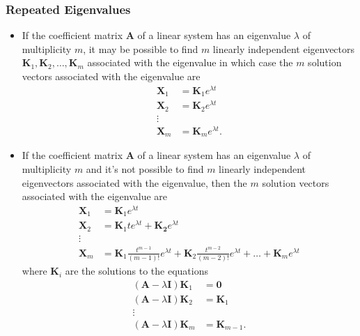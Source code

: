 \documentclass{article}
\begin{document}
\subsubsection{Repeated Eigenvalues}

\begin{itemize}
  \item If the coefficient matrix $\mathbf{A}$ of a linear system has an eigenvalue $\lambda$ of multiplicity $m$, it may be possible to find $m$ linearly independent eigenvectors $\mathbf{K}_1, \mathbf{K}_2, \ldots, \mathbf{K}_m$ associated with the eigenvalue in which case the $m$ solution vectors associated with the eigenvalue are \begin{align*}
          \mathbf{X}_1 & = \mathbf{K}_1 e^{\lambda t}  \\
          \mathbf{X}_2 & = \mathbf{K}_2 e^{\lambda t}  \\
          \vdots                                       \\
          \mathbf{X}_m & = \mathbf{K}_m e^{\lambda t}.
        \end{align*}

  \item If the coefficient matrix $\mathbf{A}$ of a linear system has an eigenvalue $\lambda$ of multiplicity $m$ and it's not possible to find $m$ linearly independent eigenvectors associated with the eigenvalue, then the $m$ solution vectors associated with the eigenvalue are \begin{align*}
          \mathbf{X}_1 & = \mathbf{K}_1 e^{\lambda t}                                                                                                                          \\
          \mathbf{X}_2 & = \mathbf{K}_1 t e^{\lambda t} + \mathbf{K_2} e^{\lambda t}                                                                                           \\
          \vdots                                                                                                                                                               \\
          \mathbf{X}_m & = \mathbf{K}_1 \frac{t^{m - 1}}{(m - 1)!} e^{\lambda t} + \mathbf{K}_2 \frac{t^{m - 2}}{(m - 2)!} e^{\lambda t} + \ldots + \mathbf{K}_m e^{\lambda t}
        \end{align*} where $\mathbf{K}_i$ are the solutions to the equations \begin{align*}
          (\mathbf{A} - \lambda \mathbf{I}) \mathbf{K}_1 & = \mathbf{0}          \\
          (\mathbf{A} - \lambda \mathbf{I}) \mathbf{K}_2 & = \mathbf{K}_1        \\
          \vdots                                                                 \\
          (\mathbf{A} - \lambda \mathbf{I}) \mathbf{K}_m & = \mathbf{K}_{m - 1}. \\
        \end{align*}
\end{itemize}
\end{document}

